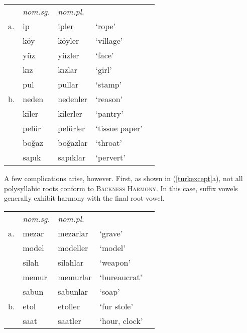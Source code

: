 \begin{example}
\label{turknom}
\begin{tabular}{lllll}
   & \emph{nom.sg.} & \emph{nom.pl.} \\
a. & {ip}           & {ipler}    & `rope'         & \citep[][216]{Clements1982} \\
   & {köy}          & {köyler}   & `village'      \\
   & {yüz}          & {yüzler}   & `face'         \\
   & {kız}          & {kızlar}   & `girl'         \\
   & {pul}          & {pullar}   & `stamp'        \\
b. & {neden}        & {nedenler} & `reason'       & \citep{TELL} \\
   & {kiler}        & {kilerler} & `pantry'       \\
   & {pelür}        & {pelürler} & `tissue paper' \\
   & {boğaz}        & {boğazlar} & `throat'       \\
   & {sapık}        & {sapıklar} & `pervert'      \\
\end{tabular}
\end{example}

A few complications arise, however. First, as shown in (\ref{turkexcept}a), not all polysyllabic roots conform to \textsc{Backness Harmony}. In this case, suffix vowels generally exhibit harmony with the final root vowel. 

\begin{example} 
\label{turkexcept}
\begin{tabular}{lllll}
   & \emph{nom.sg.} & \emph{nom.pl.}             &                    \\
a. & {mezar}        & {mezarlar} & `grave'       & \citep{TELL}       \\
   & {model}        & {modeller} & `model'                            \\
   & {silah}        & {silahlar} & `weapon'                           \\
   & {memur}        & {memurlar} & `bureaucrat'                       \\
   & {sabun}        & {sabunlar} & `soap'                             \\
b. & {etol}         & {etoller}  & `fur stole'   & \citep{Goksel2005} \\
   & {saat}         & {saatler}  & `hour, clock' 	                  \\
\end{tabular}
\end{example}

